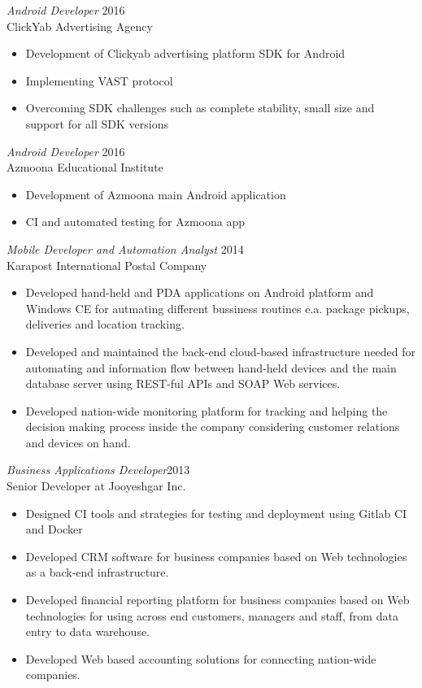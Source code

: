 \documentclass[margin, 10pt]{res} %
\begin{document}
\begin{resume}
{\sl Android Developer} \hfill 2016 \\
ClickYab Advertising Agency

\begin{itemize} \itemsep -2pt %
\item Development of Clickyab advertising platform SDK for Android
\item Implementing VAST protocol
\item Overcoming SDK challenges such as complete stability, small size and support
  for all SDK versions
\end{itemize}

{\sl Android Developer} \hfill 2016 \\
Azmoona Educational Institute

\begin{itemize} \itemsep -2pt %
\item Development of Azmoona main Android application
\item CI and automated testing for Azmoona app
\end{itemize}

{\sl Mobile Developer and Automation Analyst} \hfill 2014 \\
Karapost International Postal Company

\begin{itemize} \itemsep -2pt %
\item Developed hand-held and PDA applications on Android platform and Windows CE for autmating different bussiness
  routines e.a. package pickups, deliveries and location tracking.
\item Developed and maintained the back-end cloud-based infrastructure needed for automating and information flow between
  hand-held devices and the main database server using REST-ful APIs and SOAP Web services.
\item Developed nation-wide monitoring platform for tracking and helping the
  decision making process inside the company considering customer relations and devices on hand.
\end{itemize}
 
{\sl Business Applications Developer}\hfill 2013 \\
Senior Developer at Jooyeshgar Inc.
\begin{itemize}
\item Designed CI tools and strategies for testing and deployment using Gitlab
  CI and Docker
\item Developed CRM software for business companies based on Web technologies as a back-end infrastructure.
\item Developed financial reporting platform for business companies based on Web
  technologies for using across end customers, managers and staff, from data entry
  to data warehouse.
\item Developed Web based accounting solutions for connecting nation-wide companies.
\end{itemize} 


\end{resume}
\end{document}
